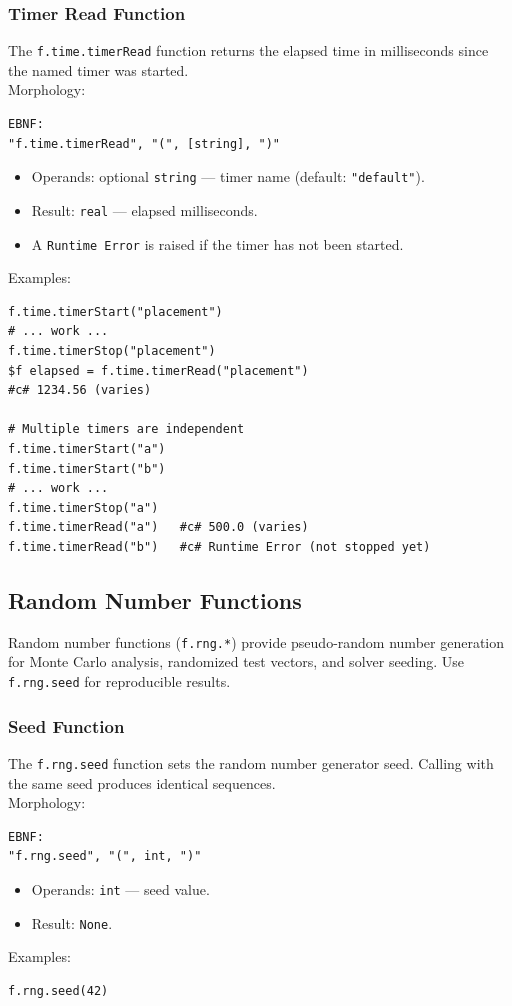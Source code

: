 \subsubsection{Timer Read Function}
The \texttt{f.time.timerRead} function returns the elapsed time in milliseconds since the named timer was started. \\
Morphology:
\begin{verbatim}
EBNF:
"f.time.timerRead", "(", [string], ")"
\end{verbatim}
\begin{itemize}
\item Operands: optional \texttt{string} --- timer name (default: \texttt{"default"}).
\item Result: \texttt{real} --- elapsed milliseconds.
\item A \texttt{Runtime Error} is raised if the timer has not been started.
\end{itemize}
Examples:
\begin{verbatim}
f.time.timerStart("placement")
# ... work ...
f.time.timerStop("placement")
$f elapsed = f.time.timerRead("placement")
#c# 1234.56 (varies)

# Multiple timers are independent
f.time.timerStart("a")
f.time.timerStart("b")
# ... work ...
f.time.timerStop("a")
f.time.timerRead("a")   #c# 500.0 (varies)
f.time.timerRead("b")   #c# Runtime Error (not stopped yet)
\end{verbatim}

\subsection{Random Number Functions}

Random number functions (\texttt{f.rng.*}) provide pseudo-random number generation for Monte Carlo analysis, randomized test vectors, and solver seeding. Use \texttt{f.rng.seed} for reproducible results.

\subsubsection{Seed Function}
The \texttt{f.rng.seed} function sets the random number generator seed. Calling with the same seed produces identical sequences. \\
Morphology:
\begin{verbatim}
EBNF:
"f.rng.seed", "(", int, ")"
\end{verbatim}
\begin{itemize}
\item Operands: \texttt{int} --- seed value.
\item Result: \texttt{None}.
\end{itemize}
Examples:
\begin{verbatim}
f.rng.seed(42)
\end{verbatim}

